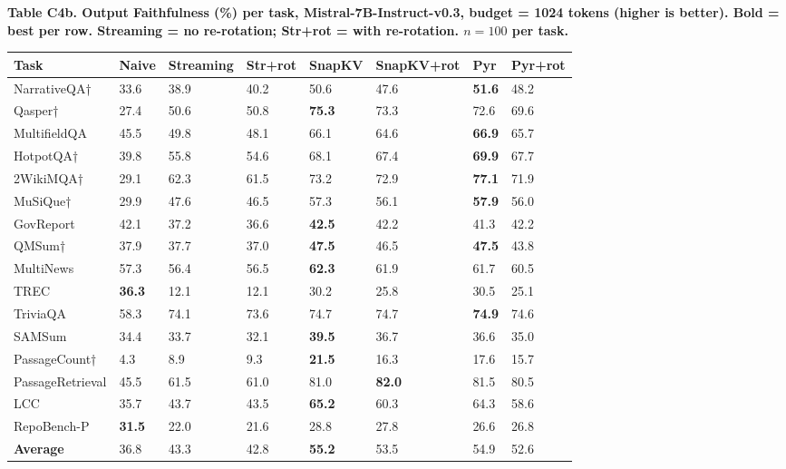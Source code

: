 \documentclass[10pt,letterpaper]{article}
\begin{document}
\textbf{Table C4b. Output Faithfulness (\%) per task, Mistral-7B-Instruct-v0.3,
budget = 1024 tokens (higher is better). Bold = best per row.
Streaming = no re-rotation; Str+rot = with re-rotation.
$n = 100$ per task.}

\begin{table}[H]
\centering
\small
\begin{tabular}{@{}llllllll@{}}
\toprule
Task & Naive & Streaming & Str+rot & SnapKV & SnapKV+rot & Pyr &
Pyr+rot\\
\midrule
NarrativeQA† & 33.6 & 38.9 & 40.2 & 50.6 & 47.6 & \textbf{51.6} &
48.2\\
Qasper† & 27.4 & 50.6 & 50.8 & \textbf{75.3} & 73.3 & 72.6 &
69.6\\
MultifieldQA & 45.5 & 49.8 & 48.1 & 66.1 & 64.6 & \textbf{66.9} &
65.7\\
HotpotQA† & 39.8 & 55.8 & 54.6 & 68.1 & 67.4 & \textbf{69.9} &
67.7\\
2WikiMQA† & 29.1 & 62.3 & 61.5 & 73.2 & 72.9 & \textbf{77.1} &
71.9\\
MuSiQue† & 29.9 & 47.6 & 46.5 & 57.3 & 56.1 & \textbf{57.9} &
56.0\\
GovReport & 42.1 & 37.2 & 36.6 & \textbf{42.5} & 42.2 & 41.3 &
42.2\\
QMSum† & 37.9 & 37.7 & 37.0 & \textbf{47.5} & 46.5 & \textbf{47.5} &
43.8\\
MultiNews & 57.3 & 56.4 & 56.5 & \textbf{62.3} & 61.9 & 61.7 &
60.5\\
TREC & \textbf{36.3} & 12.1 & 12.1 & 30.2 & 25.8 & 30.5 &
25.1\\
TriviaQA & 58.3 & 74.1 & 73.6 & 74.7 & 74.7 & \textbf{74.9} &
74.6\\
SAMSum & 34.4 & 33.7 & 32.1 & \textbf{39.5} & 36.7 & 36.6 &
35.0\\
PassageCount† & 4.3 & 8.9 & 9.3 & \textbf{21.5} & 16.3 & 17.6 &
15.7\\
PassageRetrieval & 45.5 & 61.5 & 61.0 & 81.0 & \textbf{82.0} & 81.5 &
80.5\\
LCC & 35.7 & 43.7 & 43.5 & \textbf{65.2} & 60.3 & 64.3 &
58.6\\
RepoBench-P & \textbf{31.5} & 22.0 & 21.6 & 28.8 & 27.8 & 26.6 &
26.8\\
\textbf{Average} & 36.8 & 43.3 & 42.8 & \textbf{55.2} & 53.5 & 54.9 &
52.6\\
\bottomrule
\end{tabular}
\end{table}
\end{document}

